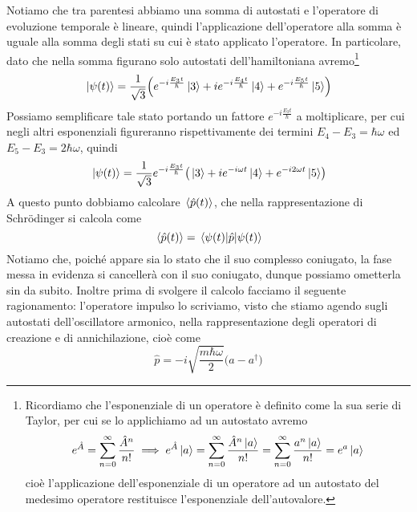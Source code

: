 \begin{soluzione}
   Notiamo che tra parentesi abbiamo una somma di autostati e l'operatore di evoluzione temporale è lineare, quindi l'applicazione dell'operatore alla somma è uguale alla somma degli stati su cui è stato applicato l'operatore. In particolare, dato che nella somma figurano solo autostati dell'hamiltoniana avremo\footnote{Ricordiamo che l'esponenziale di un operatore è definito come la sua serie di Taylor, per cui se lo applichiamo ad un autostato avremo
   \begin{equation*}
      e^{\hat{A}}
      =\sum_{n=0}^{\infty}\frac{\hat{A}^n}{n!}
   \implies
      e^{\hat{A}} \ket*{a}
      =\sum_{n=0}^{\infty}\frac{\hat{A}^n \ket*{a}}{n!}
      =\sum_{n=0}^{\infty}\frac{a^n \ket*{a}}{n!}
      =e^a \ket*{a}
   \end{equation*}
   cioè l'applicazione dell'esponenziale di un operatore ad un autostato del medesimo operatore restituisce l'esponenziale dell'autovalore.}
   \begin{equation*}
      \ket*{\psi(t)}=\frac{1}{\sqrt{3}} \qty( e^{-i\frac{E_3 t}{\hbar}}\ket*{3} + i e^{-i\frac{E_4 t}{\hbar}} \ket*{4} + e^{-i\frac{E_5 t}{\hbar}} \ket*{5} )
   \end{equation*}
   Possiamo semplificare tale stato portando un fattore $e^{-i\frac{E_3 t}{\hbar}}$ a moltiplicare, per cui negli altri esponenziali figureranno rispettivamente dei termini $E_4 - E_3=\hbar\omega$ ed $E_5 - E_3=2\hbar\omega$, quindi
   \begin{equation*}
      \ket*{\psi(t)}=\frac{1}{\sqrt{3}} e^{-i\frac{E_3 t}{\hbar}} \qty( \ket*{3} + i e^{-i\omega t} \ket*{4} + e^{-i2\omega t} \ket*{5} )
   \end{equation*}
   A questo punto dobbiamo calcolare $\expval*{\hat{p}(t)}$, che nella rappresentazione di Schrödinger si calcola come
   \begin{equation*}
      \expval*{\hat{p}(t)}
      =\mel*{\psi(t)}{\hat{p}}{\psi(t)}
   \end{equation*}
   Notiamo che, poiché appare sia lo stato che il suo complesso coniugato, la fase messa in evidenza si cancellerà con il suo coniugato, dunque possiamo ometterla sin da subito. Inoltre prima di svolgere il calcolo facciamo il seguente ragionamento: l'operatore impulso lo scriviamo, visto che stiamo agendo sugli autostati dell'oscillatore armonico, nella rappresentazione degli operatori di creazione e di annichilazione, cioè come
   \begin{equation*}
      \hat{p}
      =-i\sqrt{\frac{m \hbar \omega}{2}}\bigl(a - a^{\dag}\bigr)
   \end{equation*}

\end{soluzione}
